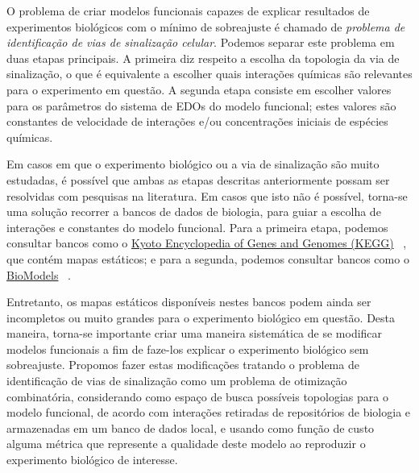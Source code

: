 \documentclass[12pt]{article}
\begin{document}


O problema de criar modelos funcionais capazes de explicar resultados
de experimentos biológicos com o mínimo de sobreajuste é chamado de 
{\em problema de identificação de vias de sinalização celular}. Podemos 
separar este problema em duas etapas principais. A primeira diz respeito
a escolha da topologia da via de sinalização, o que é equivalente a 
escolher quais interações químicas são relevantes para o experimento em
questão. A segunda etapa consiste em escolher valores para os parâmetros
do sistema de EDOs do modelo funcional; estes valores são constantes de 
velocidade de interações e/ou concentrações iniciais de espécies 
químicas.

Em casos em que o experimento biológico ou a via de sinalização são 
muito estudadas, é possível que ambas as etapas descritas anteriormente
possam ser resolvidas com pesquisas na literatura. Em casos que isto não
é possível, torna-se uma solução recorrer a bancos de dados de biologia,
para guiar a escolha de interações e constantes do modelo funcional.
Para a primeira etapa, podemos consultar bancos como o 
\href{http://www.genome.jp/kegg/}{Kyoto Encyclopedia of Genes and Genomes (KEGG)}
~\cite{Kanehisa2000kegg}, que contém mapas estáticos; e para a segunda,
podemos consultar bancos como o 
\href{https://www.ebi.ac.uk/biomodels-main/}{BioModels}~\cite{le2006biomodels}
.

Entretanto, os mapas estáticos disponíveis nestes bancos podem ainda ser
incompletos ou muito grandes para o experimento biológico em questão. 
Desta maneira, torna-se importante criar uma maneira sistemática de se
modificar modelos funcionais a fim de faze-los explicar o experimento 
biológico sem sobreajuste. Propomos fazer estas modificações tratando
o problema de identificação de vias de sinalização como um problema de
otimização combinatória, considerando como espaço de busca possíveis 
topologias para o modelo funcional, de acordo com interações retiradas 
de repositórios de biologia e armazenadas em um banco de dados local,
e usando como função de custo alguma métrica que represente a qualidade 
deste modelo ao reproduzir o experimento biológico de interesse.
\end{document}

